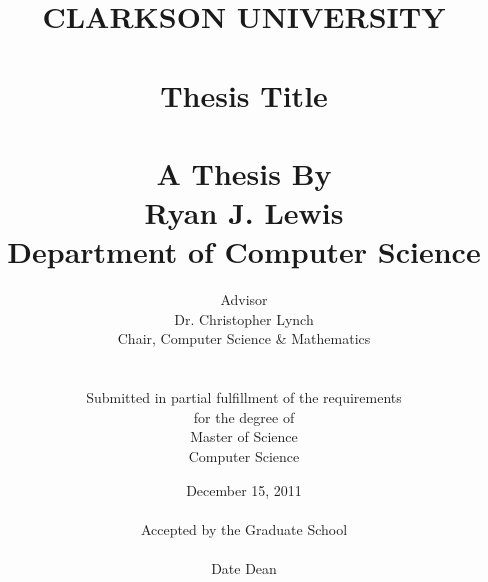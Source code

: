 \documentclass[letterpaper,12pt]{report}
\title{CLARKSON UNIVERSITY \\
\ \\
Thesis Title \\ 
\ \\
\large{A Thesis By \\
\textbf{Ryan J. Lewis} \\
Department of Computer Science \\
}}
\author{Advisor \\
Dr. 	Christopher Lynch \\
Chair, Computer Science \& Mathematics \\
\ \\ \\
Submitted in partial fulfillment of the requirements \\
for the degree of \\
Master of Science \\
Computer Science}
\date{December 15, 2011 \\
\ \\
Accepted by the Graduate School \\
\vspace{.5in}
\hrulefill \\
Date \hspace{2in} Dean
}
\begin{document}
%
%
%
%
%
%
%
%
%
%
%
%
%
%
%
\cleardoublepage


\tableofcontents
\listoffigures

\cleardoublepage


\doublespacing







\singlespacing

\raggedright



\doublespacing

\begin{appendices}


\end{appendices}
\end{document}
